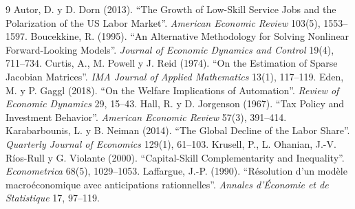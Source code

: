 \documentclass[12pt,letterpaper]{article}
\begin{document}
\small
\begin{thebibliography}{9}
\setlength{\itemsep}{0pt}\setlength{\parskip}{0pt}
 Autor, D. y D. Dorn (2013). ``The Growth of Low-Skill Service Jobs and the Polarization of the US Labor Market''. \emph{American Economic Review} 103(5), 1553--1597.
 Boucekkine, R. (1995). ``An Alternative Methodology for Solving Nonlinear Forward-Looking Models''. \emph{Journal of Economic Dynamics and Control} 19(4), 711--734.
 Curtis, A., M. Powell y J. Reid (1974). ``On the Estimation of Sparse Jacobian Matrices''. \emph{IMA Journal of Applied Mathematics} 13(1), 117--119.
 Eden, M. y P. Gaggl (2018). ``On the Welfare Implications of Automation''. \emph{Review of Economic Dynamics} 29, 15--43.
 Hall, R. y D. Jorgenson (1967). ``Tax Policy and Investment Behavior''. \emph{American Economic Review} 57(3), 391--414.
 Karabarbounis, L. y B. Neiman (2014). ``The Global Decline of the Labor Share''. \emph{Quarterly Journal of Economics} 129(1), 61--103.
 Krusell, P., L. Ohanian, J.-V. Ríos-Rull y G. Violante (2000). ``Capital-Skill Complementarity and Inequality''. \emph{Econometrica} 68(5), 1029--1053.
 Laffargue, J.-P. (1990). ``Résolution d'un modèle macroéconomique avec anticipations rationnelles''. \emph{Annales d'Économie et de Statistique} 17, 97--119.
\end{thebibliography}
\end{document}
